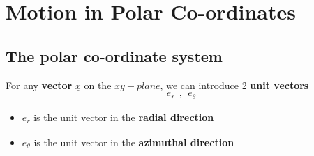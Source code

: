 \section{Motion in Polar Co-ordinates}
\subsection{The polar co-ordinate system}
For any \textbf{vector} $\underline{x}$ on the $xy-plane$, we can introduce 2 {\bf unit vectors}
$$\underline{e_{r}} \ \ ,  \ \ \underline{e_{\theta}}$$
\begin{itemize}
	\item  $\underline{e_{r}}$ is the unit vector in the {\bf radial direction}
	\item  $\underline{e_{\theta}}$ is the unit vector in the {\bf azimuthal direction}
\end{itemize}


